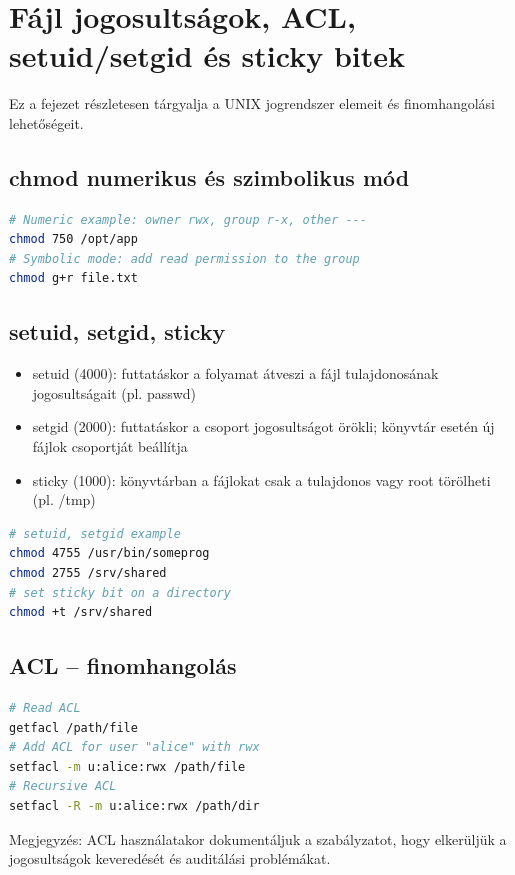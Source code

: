 \section{Fájl jogosultságok, ACL, setuid/setgid és sticky bitek}

Ez a fejezet részletesen tárgyalja a UNIX jogrendszer elemeit és finomhangolási lehetőségeit.

\subsection{chmod numerikus és szimbolikus mód}
\begin{lstlisting}[language=bash]
# Numeric example: owner rwx, group r-x, other ---
chmod 750 /opt/app
# Symbolic mode: add read permission to the group
chmod g+r file.txt
\end{lstlisting}

\subsection{setuid, setgid, sticky}
\begin{itemize}
  \item setuid (4000): futtatáskor a folyamat átveszi a fájl tulajdonosának jogosultságait (pl. passwd)
  \item setgid (2000): futtatáskor a csoport jogosultságot örökli; könyvtár esetén új fájlok csoportját beállítja
  \item sticky (1000): könyvtárban a fájlokat csak a tulajdonos vagy root törölheti (pl. /tmp)
\end{itemize}

\begin{lstlisting}[language=bash]
# setuid, setgid example
chmod 4755 /usr/bin/someprog
chmod 2755 /srv/shared
# set sticky bit on a directory
chmod +t /srv/shared
\end{lstlisting}

\subsection{ACL – finomhangolás}
\begin{lstlisting}[language=bash]
# Read ACL
getfacl /path/file
# Add ACL for user "alice" with rwx
setfacl -m u:alice:rwx /path/file
# Recursive ACL
setfacl -R -m u:alice:rwx /path/dir
\end{lstlisting}

Megjegyzés: ACL használatakor dokumentáljuk a szabályzatot, hogy elkerüljük a jogosultságok keveredését és auditálási problémákat.
